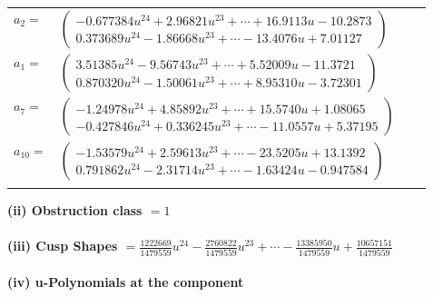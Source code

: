 \documentclass[1p]{elsarticle_modified}
\theoremstyle{definition}
\begin{document}
\begin{tabular}{m{7pt} m{180pt} m{7pt} m{180pt} }
\flushright $a_{2}=$&$\begin{pmatrix}-0.677384 u^{24}+2.96821 u^{23}+\cdots+16.9113 u-10.2873\\0.373689 u^{24}-1.86668 u^{23}+\cdots-13.4076 u+7.01127\end{pmatrix}$ \\
\flushright $a_{1}=$&$\begin{pmatrix}3.51385 u^{24}-9.56743 u^{23}+\cdots+5.52009 u-11.3721\\0.870320 u^{24}-1.50061 u^{23}+\cdots+8.95310 u-3.72301\end{pmatrix}$ \\
\flushright $a_{7}=$&$\begin{pmatrix}-1.24978 u^{24}+4.85892 u^{23}+\cdots+15.5740 u+1.08065\\-0.427846 u^{24}+0.336245 u^{23}+\cdots-11.0557 u+5.37195\end{pmatrix}$ \\
\flushright $a_{10}=$&$\begin{pmatrix}-1.53579 u^{24}+2.59613 u^{23}+\cdots-23.5205 u+13.1392\\0.791862 u^{24}-2.31714 u^{23}+\cdots-1.63424 u-0.947584\end{pmatrix}$\\&\end{tabular}
\flushleft \textbf{(ii) Obstruction class $= 1$}\\~\\
\flushleft \textbf{(iii) Cusp Shapes $= \frac{1222669}{1479559} u^{24}-\frac{2760822}{1479559} u^{23}+\cdots-\frac{13385950}{1479559} u+\frac{10657151}{1479559}$}\\~\\
\newpage\renewcommand{\arraystretch}{1}
\flushleft \textbf{(iv) u-Polynomials at the component}\newline \\
\end{document}

